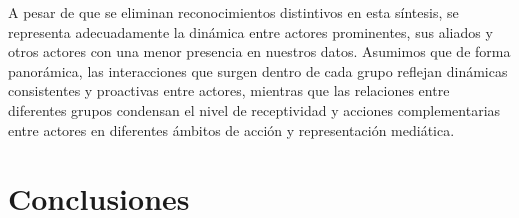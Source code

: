\documentclass[letterpaper, 11pt]{book}
\theoremstyle{definition}
\theoremstyle{remark}
\begin{document}
A pesar de que se eliminan reconocimientos distintivos en esta síntesis, se representa adecuadamente la dinámica entre actores prominentes, sus aliados y otros actores con una menor presencia en nuestros datos. 
Asumimos que de forma panorámica, las interacciones que surgen dentro de cada grupo reflejan dinámicas consistentes y proactivas entre actores, mientras que las relaciones entre diferentes grupos condensan el nivel de receptividad y acciones complementarias entre actores en diferentes ámbitos de acción y representación mediática. 









\chapter{Conclusiones}
\label{chap:Conclusiones}
\end{document}

